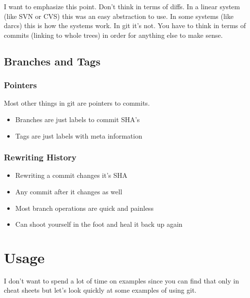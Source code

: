 I want to emphasize this point. Don't think in terms of diffs. In a linear
system (like SVN or CVS) this was an easy abstraction to use. In some systems
(like darcs) this is how the systems work. In git it's not. You have to think in
terms of commits (linking to whole trees) in order for anything else to make
sense.

\subsection{Branches and Tags}

\begin{frame}
  \frametitle{Pointers}
  Most other things in git are pointers to commits.
  \begin{itemize}
  \item Branches are just labels to commit SHA's
  \item Tags are just labels with meta information
  \end{itemize}
\end{frame}

\begin{frame}
  \frametitle{Rewriting History}
  \begin{itemize}
  \item Rewriting a commit changes it's SHA
    \pause
  \item Any commit after it changes as well
    \pause
  \item Most branch operations are quick and painless
    \pause
  \item Can shoot yourself in the foot and heal it back up again
  \end{itemize}
\end{frame}

\section{Usage}

I don't want to spend a lot of time on examples since you can find that only in
cheat sheets but let's look quickly at some examples of using git.

